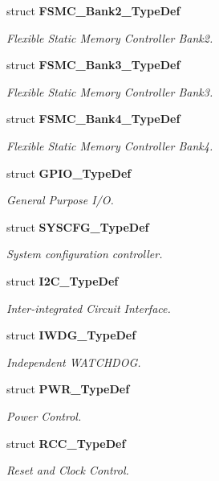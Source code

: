 \begin{DoxyCompactItemize}
struct \textbf{ F\+S\+M\+C\+\_\+\+Bank2\+\_\+\+Type\+Def}
\begin{DoxyCompactList}\small\item\em Flexible Static Memory Controller Bank2. \end{DoxyCompactList}\item 
struct \textbf{ F\+S\+M\+C\+\_\+\+Bank3\+\_\+\+Type\+Def}
\begin{DoxyCompactList}\small\item\em Flexible Static Memory Controller Bank3. \end{DoxyCompactList}\item 
struct \textbf{ F\+S\+M\+C\+\_\+\+Bank4\+\_\+\+Type\+Def}
\begin{DoxyCompactList}\small\item\em Flexible Static Memory Controller Bank4. \end{DoxyCompactList}\item 
struct \textbf{ G\+P\+I\+O\+\_\+\+Type\+Def}
\begin{DoxyCompactList}\small\item\em General Purpose I/O. \end{DoxyCompactList}\item 
struct \textbf{ S\+Y\+S\+C\+F\+G\+\_\+\+Type\+Def}
\begin{DoxyCompactList}\small\item\em System configuration controller. \end{DoxyCompactList}\item 
struct \textbf{ I2\+C\+\_\+\+Type\+Def}
\begin{DoxyCompactList}\small\item\em Inter-\/integrated Circuit Interface. \end{DoxyCompactList}\item 
struct \textbf{ I\+W\+D\+G\+\_\+\+Type\+Def}
\begin{DoxyCompactList}\small\item\em Independent W\+A\+T\+C\+H\+D\+OG. \end{DoxyCompactList}\item 
struct \textbf{ P\+W\+R\+\_\+\+Type\+Def}
\begin{DoxyCompactList}\small\item\em Power Control. \end{DoxyCompactList}\item 
struct \textbf{ R\+C\+C\+\_\+\+Type\+Def}
\begin{DoxyCompactList}\small\item\em Reset and Clock Control. \end{DoxyCompactList}\item 

\end{DoxyCompactItemize}
